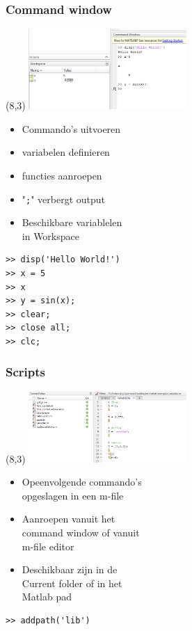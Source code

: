 \documentclass[t]{beamer}
\begin{document}
\begin{frame}[fragile]
	\frametitle{Command window}
    \begin{textblock}{6}(8,3)
        \includegraphics[width=6cm]{fig/commandwindow}
    \end{textblock}
    	
    \begin{itemize}
		\item Commando's uitvoeren
		\item variabelen definieren
		\item functies aanroepen
		\item "\lstinline{;}" verbergt output
		\item Beschikbare variablelen\\ in Workspace
	\end{itemize}
	
    \vspace{0.5cm}
    
	\begin{lstlisting}
>> disp('Hello World!')
>> x = 5
>> x
>> y = sin(x);
>> clear;
>> close all;
>> clc;
	\end{lstlisting}
\end{frame}
\begin{frame}[fragile]
	\frametitle{Scripts}
	\begin{textblock}{6}(8,3)
        \includegraphics[width=6cm]{fig/available}
    \end{textblock}
    
	\begin{itemize}
		\item Opeenvolgende commando's\\ opgeslagen in een m-file
		\item Aanroepen vanuit het \\command window of vanuit \\m-file editor
		\item Deschikbaar zijn in de \\Current folder of in het \\Matlab pad
	\end{itemize}
	
	\vspace{1cm}
	
	\begin{lstlisting}
>> addpath('lib')
	\end{lstlisting}
\end{frame}
\end{document}

